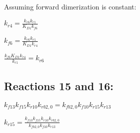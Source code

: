 \documentclass[12pt]{article}
\begin{document}
Assuming forward dimerization is constant:

$ k_{r4} = \frac{k_{r6} k_{r1}}{K_{D1} k_{f6}}$

$ k_{f6} = \frac{k_{r6} k_{r1}}{K_{D1} k_{r4}}$

$ \frac{k_{f6} K_{D1} k_{r4}}{k_{r1}} = k_{r6}$




\subsection*{Reactions 15 and 16:}

$ k_{f13} k_{f15} k_{r10} k_{rb2,0} = k_{fb2,0} k_{f10} k_{r15} k_{r13} $

$ k_{r15} = \frac{k_{f13} k_{f15} k_{r10} k_{rb2,0}}{k_{fb2,0} k_{f10} k_{r13}} $
\end{document}
